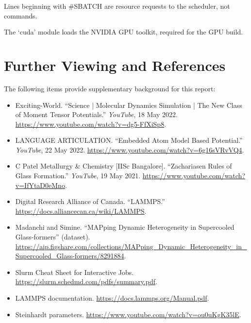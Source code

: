 \documentclass{article}
\begin{document}
Lines beginning with \#SBATCH are resource requests to the scheduler, not commands.

The `cuda' module loads the NVIDIA GPU toolkit, required for the GPU build.

\section{Further Viewing and References}
\noindent The following items provide supplementary background for this report:
\begin{itemize}
    \item Exciting-World. ``Science | Molecular Dynamics Simulation | The New Class of Moment Tensor Potentials.'' \textit{YouTube}, 18 May 2022. \url{https://www.youtube.com/watch?v=dg5-FfXiSp8}.
    \item LANGUAGE ARTICULATION. ``Embedded Atom Model Based Potential.'' \textit{YouTube}, 22 May 2022. \url{https://www.youtube.com/watch?v=6g16sVRvVQ4}.
    \item C Patel Metallurgy \& Chemistry [IISc Bangalore]. ``Zachariasen Rules of Glass Formation.'' \textit{YouTube}, 19 May 2021. \url{https://www.youtube.com/watch?v=IfYtaD0eMno}.
    \item Digital Research Alliance of Canada. ``LAMMPS.'' \url{https://docs.alliancecan.ca/wiki/LAMMPS}.
    \item Madanchi and Simine. ``MAPping Dynamic Heterogeneity in Supercooled Glass-formers'' (dataset). \url{https://aip.figshare.com/collections/MAPping_Dynamic_Heterogeneity_in_Supercooled_Glass-formers/8291884}.
    \item Slurm Cheat Sheet for Interactive Jobs. \url{https://slurm.schedmd.com/pdfs/summary.pdf}.
    \item LAMMPS documentation. \url{https://docs.lammps.org/Manual.pdf}.
    \item Steinhardt parameters. \url{https://www.youtube.com/watch?v=ou0uKgK35lE}.
\end{itemize}
\end{document}
